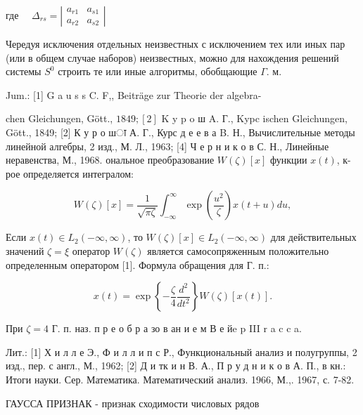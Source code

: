\documentclass[10pt]{article}
\begin{document}
где $\quad \Delta_{r s}=\left|\begin{array}{cc}a_{r 1} & a_{s 1} \\ a_{r 2} & a_{s 2}\end{array}\right|$



Чередуя исключения отдельных неизвестных с исключением тех или иных пар (или в общем случае наборов) неизвестных, можно для нахождения решений системы $S^{0}$ строить те или иные алгоритмы, обобщающие $\Gamma$. м.



Jum.: [1] G a u s s C. F,, Beiträge zur Theorie der algebra-

chen Gleichungen, Gött., $1849 ;[2]$ K y p o ш A. Г., Kypc ischen Gleichungen, Gött., 1849; [2] К у р о шा А. Г., Курс д е е в а B. Н., Вычислительные методы линейной алгебры, 2 изд., М. Л., 1963; [4] Ч е р н и к о в С. Н., Линейные неравенства, М., 1968. ональное преобразование $W(\zeta)[x]$ функции $x(t)$, к-рое определяется интегралом:



\[

W(\zeta)[x]=\frac{1}{\sqrt{\pi \zeta}} \int_{-\infty}^{\infty} \exp \left(\frac{u^{2}}{\zeta}\right) x(t+u) d u,

\]



Если $x(t) \in L_{2}(-\infty, \infty)$, то $W(\zeta)[x] \in L_{2}(-\infty, \infty)$ для действительных значений $\zeta=\xi$ оператор $W(\zeta)$ является самосопряженным положительно определенным оператором [1]. Формула обращения для Г. п.:



\[

x(t)=\exp \left\{-\frac{\zeta}{4} \frac{d^{2}}{d t^{2}}\right\} W(\zeta)[x(t)] .

\]



При $\zeta=4$ Г. п. наз. п р е о б р а зо в ан и е м В е йe p III $\mathrm{r}$ a c c a.



Лит.: [1] Х и л л е Э., Ф и л л и п с Р., Функциональный анализ и полугруппы, 2 изд., пер. с англ., М., 1962; [2] Д и тк и н В. А., П р у д н и к о в А. П., в кн.: Итоги науки. Сер. Математика. Математический анализ. 1966, М.,. 1967, с. 7-82.



ГАУССА ПРИЗНАК - признак сходимости числовых рядов
\end{document}

